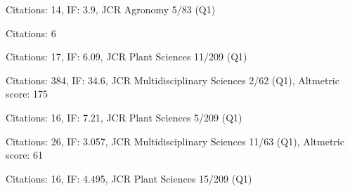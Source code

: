\documentclass[]{friggeri-cv} %
\begin{document}
\cite{bayer2015high}
\hspace{0.4cm} Citations: 14, IF: 3.9, JCR Agronomy 5/83 (Q1)
 
\cite{golicz2015skim}
\hspace{0.4cm} Citations: 6

\cite{lai2015identification}
\hspace{0.4cm} Citations: 17,  IF: 6.09, JCR Plant Sciences 11/209 (Q1)

\cite{chalhoub2014early}
\hspace{0.4cm} Citations: 384, IF: 34.6, JCR Multidisciplinary Sciences 2/62 (Q1), Altmetric score: 175

\cite{mason2014high}
\hspace{0.4cm} Citations: 16, IF: 7.21, JCR Plant Sciences 5/209 (Q1)

\cite{greshake2014opensnp}
\hspace{0.4cm} Citations: 26, IF: 3.057, JCR Multidisciplinary Sciences 11/63 (Q1), Altmetric score: 61

\cite{dattolo2013acclimation}
\hspace{0.4cm} Citations: 16, IF: 4.495, JCR Plant Sciences 15/209 (Q1)







\end{document}
